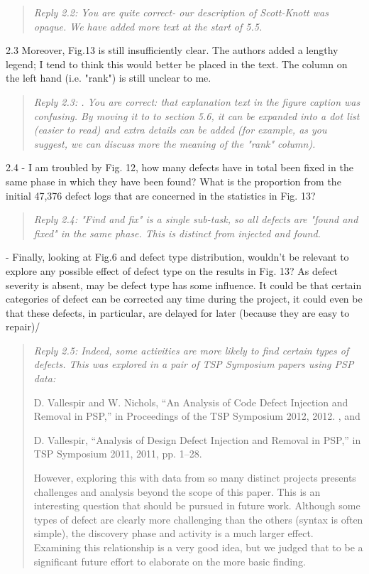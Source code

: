 \documentclass[smallcondensed]{svjour3}
\begin{document}
\begin{quote}{\em 
Reply 2.2: You are quite correct- our description of Scott-Knott was opaque. We have added more text at the start of 5.5.
}\end{quote}

2.3 Moreover, Fig.13 is still insufficiently clear. The authors added a lengthy legend; I tend to think this would better be placed in the text. The column on the left hand (i.e. "rank") is still unclear to me.

\begin{quote}{\em 
Reply 2.3: . You are correct: that explanation text in the figure caption was confusing. By moving it to to section 5.6, it can be expanded into a dot list (easier to read) and extra details
can be added (for example, as you suggest, we can discuss more the meaning of the "rank" column).
}\end{quote}

2.4 - I am troubled by Fig. 12, how many defects have in total been fixed in the same phase in which they have been found? What is the proportion from the initial 47,376 defect logs that are concerned in the statistics in Fig. 13?

\begin{quote}{\em 
Reply 2.4: "Find and fix" is a single sub-task, so all defects are "found and fixed" in the same phase. This is distinct from injected and found.
}\end{quote}

- Finally, looking at Fig.6 and defect type distribution, wouldn't be relevant to explore any possible effect of defect type on the results in Fig. 13? As defect severity is absent, may be defect type has some influence. It could be that certain categories of defect can be corrected any time during the project, it could even be that these defects, in particular, are delayed for later (because they are easy to repair)/

\begin{quote}{\em 
Reply 2.5: Indeed, some activities are more likely to find certain types of defects. This was explored in a pair of TSP Symposium papers using PSP data:

D. Vallespir and W. Nichols, “An Analysis of Code Defect Injection and Removal in PSP,” in Proceedings of the TSP Symposium 2012, 2012. , and

D. Vallespir, “Analysis of Design Defect Injection and Removal in PSP,” in TSP Symposium 2011, 2011, pp. 1–28.

However, exploring this with data from so many distinct projects presents challenges and analysis beyond the scope of this paper. This is an interesting question that should be pursued in future work. 
Although some types of defect are clearly more challenging than the others (syntax is often simple), the discovery phase and activity is a much larger effect. Examining this relationship is a very good idea, but we judged that to be a significant future effort to elaborate on the more basic finding.
}\end{quote}
\end{document}

